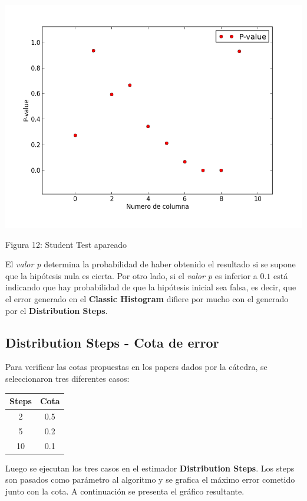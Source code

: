 \documentclass[10pt, a4paper,english,spanish,hidelinks]{article}
\begin{document}
\centerline{  \includegraphics[scale=0.7]{./imagenes/ejc1_p_100.png}}
\centerline{Figura 12: Student Test apareado}

El \textit{valor p} determina la probabilidad de haber obtenido el resultado si se supone que la hipótesis nula es cierta. Por otro lado, si el \textit{valor p} es inferior a $0.1$ está indicando que hay probabilidad de que la hipótesis inicial sea falsa, es decir, que el error generado en el \textbf{Classic Histogram} difiere por mucho con el generado por el \textbf{Distribution Steps}.

\subsection{Distribution Steps - Cota de error}

Para verificar las cotas propuestas en los papers dados por la cátedra, se seleccionaron tres diferentes casos:

\begin{table}[htdp]
  \begin{center}
    \begin{tabular}{|c|c|} \hline
       Steps & Cota \\ \hline
       2  & 0.5 \\ \hline
       5  & 0.2 \\ \hline
       10 & 0.1 \\ \hline
    \end{tabular}
  \end{center}
\end{table} 

Luego se ejecutan los tres casos en el estimador \textbf{Distribution Steps}. Los steps son pasados como parámetro al algoritmo y se grafica el máximo error cometido junto con la cota. A continuación se presenta el gráfico resultante. 
\end{document}
